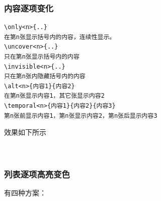 \subsubsection{内容逐项变化}


\begin{shaded}
\begin{Verbatim}
\only<n>{..}
在第n张显示括号内的内容，连续性显示。
\uncover<n>{..}
只在第n张显示括号内的内容
\invisible<n>{..}
只在第n张内隐藏括号内的内容
\alt<n>{内容1}{内容2}
在第n张显示内容1，其它张显示内容2
\temporal<n>{内容1}{内容2}{内容3}
第n张前显示内容1，第n张显示内容2，第n张后显示内容3
\end{Verbatim}
\end{shaded}
\textcolor[rgb]{1.00,0.00,0.00}{效果如下所示}\\~\\
\\
\subsubsection{列表逐项高亮变色}
有四种方案：\\


